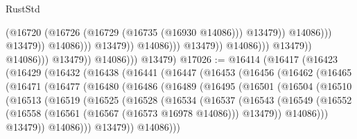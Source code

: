 \begin{lexlean}{RustStd}
\begin{coremodule}
                                                              (@16720
                                                                (@16726
                                                                  (@16729 (@16735 (@16930 @14086)))
                                                                  @13479))
                                                              @14086)))
                                                        @13479))
                                                    @14086)))
                                              @13479))
                                          @14086)))
                                    @13479))
                                @14086)))
                          @13479))
                      @14086)))
                @13479))
            @14086)))
      @13479)
@17026 := @16414
    (@16417
      (@16423
        (@16429
          (@16432
            (@16438
              (@16441
                (@16447
                  (@16453
                    (@16456
                      (@16462
                        (@16465
                          (@16471
                            (@16477
                              (@16480
                                (@16486
                                  (@16489
                                    (@16495
                                      (@16501
                                        (@16504
                                          (@16510
                                            (@16513
                                              (@16519
                                                (@16525
                                                  (@16528
                                                    (@16534
                                                      (@16537
                                                        (@16543
                                                          (@16549
                                                            (@16552
                                                              (@16558
                                                                (@16561
                                                                  (@16567 (@16573 @16978 @14086)))
                                                                @13479))
                                                            @14086)))
                                                      @13479))
                                                  @14086)))
                                            @13479))
                                        @14086)))

\end{coremodule}
\end{lexlean}
